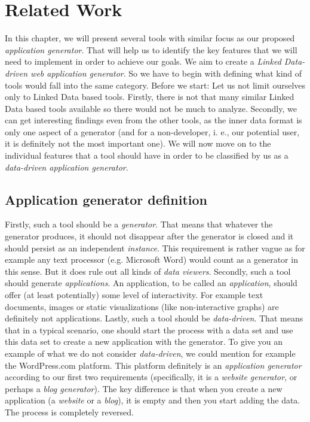 \chapter{Related Work}

In this chapter, we will present several tools with similar focus as our proposed \emph{application generator}. That will help us to identify the key features that we will need to implement in order to achieve our goals. We aim to create a \emph{Linked Data-driven web application generator}. So we have to begin with defining what kind of tools would fall into the same category. Before we start: Let us not limit ourselves only to Linked Data based tools. Firstly, there is not that many similar Linked Data based tools available so there would not be much to analyze. Secondly, we can get interesting findings even from the other tools, as the inner data format is only one aspect of a generator (and for a non-developer, i. e., our potential user, it is definitely not the most important one). We will now move on to the individual features that a tool should have in order to be classified by us as a \emph{data-driven application generator}.

\section{Application generator definition}
\label{sec:rw:definition}

Firstly, such a tool should be a \emph{generator}. That means that whatever the generator produces, it should not disappear after the generator is closed and it should persist as an independent \emph{instance}. This requirement is rather vague as for example any text processor (e.g. Microsoft Word) would count as a generator in this sense. But it does rule out all kinds of \emph{data viewers}. Secondly, such a tool should generate \emph{applications}. An application, to be called an \emph{application}, should offer (at least potentially) some level of interactivity. For example text documents, images or static visualizations (like non-interactive graphs) are definitely not applications. Lastly, such a tool should be \emph{data-driven}. That means that in a typical scenario, one should start the process with a data set and use this data set to create a new application with the generator.  To give you an example of what we do not consider \emph{data-driven}, we could mention for example the WordPress.com \cite{wordpress} platform. This platform definitely is an \emph{application generator} according to our first two requirements (specifically, it is a \emph{website generator}, or perhaps a \emph{blog generator}). The key difference is that when you create a new application (a \emph{website} or a \emph{blog}), it is empty and then you start adding the data. The process is completely reversed.

